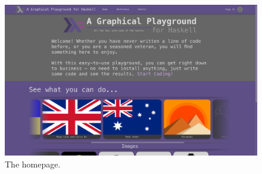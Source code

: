 \documentclass[../main.tex]{subfiles}
\begin{document}
            \begin{figure}[H]
                \centering
                \includegraphics[width=0.75\linewidth]{images/homepage.png}
                    \caption{The homepage.}
                    \label{fig:homepage}
            \end{figure}
\end{document}
